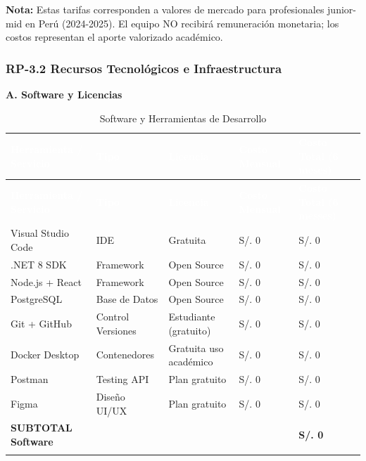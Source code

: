 \documentclass[12pt,a4paper]{article}
\begin{document}
\textbf{Nota:} Estas tarifas corresponden a valores de mercado para profesionales junior-mid en Perú (2024-2025). El equipo NO recibirá remuneración monetaria; los costos representan el aporte valorizado académico.

\subsubsection{RP-3.2 Recursos Tecnológicos e Infraestructura}

\textbf{A. Software y Licencias}

\begin{longtable}{|>{\raggedright\arraybackslash}p{4.5cm}|>{\centering\arraybackslash}p{3cm}|>{\centering\arraybackslash}p{2.5cm}|>{\centering\arraybackslash}p{2cm}|>{\raggedright\arraybackslash}p{2cm}|}
\hline
\rowcolor{headercolor}
\textcolor{white}{\textbf{Herramienta / Servicio}} & \textcolor{white}{\textbf{Tipo}} & \textcolor{white}{\textbf{Licencia}} & \textcolor{white}{\textbf{Costo Mensual}} & \textcolor{white}{\textbf{Costo Total (6 meses)}} \\
\hline
\endfirsthead
\hline
\rowcolor{headercolor}
\textcolor{white}{\textbf{Herramienta / Servicio}} & \textcolor{white}{\textbf{Tipo}} & \textcolor{white}{\textbf{Licencia}} & \textcolor{white}{\textbf{Costo Mensual}} & \textcolor{white}{\textbf{Costo Total (6 messes)}} \\
\hline
\endhead
\hline
\endlastfoot

Visual Studio Code & IDE & Gratuita & S/. 0 & S/. 0 \\
\hline
\rowcolor{rowgray}
.NET 8 SDK & Framework & Open Source & S/. 0 & S/. 0 \\
\hline
Node.js + React & Framework & Open Source & S/. 0 & S/. 0 \\
\hline
\rowcolor{rowgray}
PostgreSQL & Base de Datos & Open Source & S/. 0 & S/. 0 \\
\hline
Git + GitHub & Control Versiones & Estudiante (gratuito) & S/. 0 & S/. 0 \\
\hline
\rowcolor{rowgray}
Docker Desktop & Contenedores & Gratuita uso académico & S/. 0 & S/. 0 \\
\hline
Postman & Testing API & Plan gratuito & S/. 0 & S/. 0 \\
\hline
\rowcolor{rowgray}
Figma & Diseño UI/UX & Plan gratuito & S/. 0 & S/. 0 \\
\hline
\textbf{SUBTOTAL Software} & & & & \textbf{S/. 0} \\
\hline
\caption{Software y Herramientas de Desarrollo}
\end{longtable}
\end{document}
